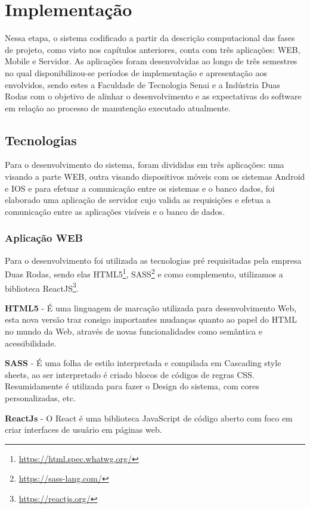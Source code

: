 \chapter{Implementação}

Nessa etapa, o sistema codificado a partir da descrição computacional das fases de projeto, como visto nos capítulos anteriores, conta com três aplicações: WEB, Mobile e Servidor. As aplicações foram desenvolvidas ao longo de três semestres no qual disponibilizou-se períodos de implementação e apresentação aos envolvidos, sendo estes a Faculdade de Tecnologia Senai e a Indústria Duas Rodas com o objetivo de alinhar o desenvolvimento e as expectativas do software em relação ao processo de manutenção executado atualmente.

\section{Tecnologias}
Para o desenvolvimento do sistema, foram divididas em três aplicações: uma visando a parte WEB, outra visando dispositivos móveis com os sistemas Android e IOS e para efetuar a comunicação entre os sistemas e o banco dados, foi elaborado uma aplicação de servidor cujo valida as requisições e efetua a comunicação entre as aplicações visíveis e o banco de dados.

\subsection{Aplicação WEB}

Para o desenvolvimento foi utilizada as tecnologias pré requisitadas pela empresa Duas Rodas, sendo elas HTML5\footnote{\url{https://html.spec.whatwg.org/}}, SASS\footnote{\url{https://sass-lang.com/}} e como complemento, utilizamos a biblioteca ReactJS\footnote{\url{https://reactjs.org/}}.

{\textbf{HTML5} - É uma linguagem de marcação utilizada para desenvolvimento Web, esta nova versão traz consigo importantes mudanças quanto ao papel do HTML no mundo da Web, através de novas funcionalidades como semântica e acessibilidade.}

{\textbf{SASS} - É uma folha de estilo interpretada e compilada em Cascading style sheets, ao ser interpretado é criado blocos de códigos de regras CSS. Resumidamente é utilizada para fazer o Design do sistema, com cores personalizadas, etc.}

{\textbf{ReactJs} - O React é uma biblioteca JavaScript de código aberto com foco em criar interfaces de usuário em páginas web.}

